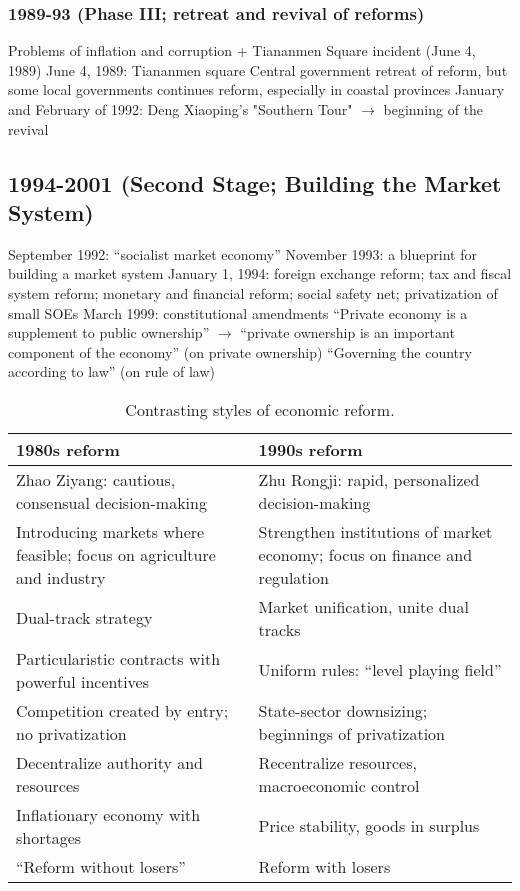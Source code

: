 \documentclass[11pt]{article}
\theoremstyle{definition}
\theoremstyle{remark}
\begin{document}
\subsubsection{1989-93 (Phase III; retreat and revival of reforms)}
\begin{outline}[enumerate]
\1 Problems of inflation and corruption + Tiananmen Square incident (June 4, 1989)
\1 June 4, 1989: Tiananmen square
\1 Central government retreat of reform, but some local governments continues reform, especially in coastal provinces
\1 January and February of 1992: Deng Xiaoping's "Southern Tour" $\to$ beginning of the revival
\end{outline}

\subsection{1994-2001 (Second Stage; Building the Market System)}
\begin{outline}[enumerate]
\1 September 1992: ``socialist market economy''
\1 November 1993: a blueprint for building a market system
\1 January 1, 1994: foreign exchange reform; tax and fiscal system reform; monetary and financial reform; social safety net; privatization of small SOEs
\1 March 1999: constitutional amendments
	\2 ``Private economy is a supplement to public ownership'' $\to$ ``private ownership is an important component of the economy'' (on private ownership)
	\2 ``Governing the country according to law'' (on rule of law)
\end{outline}

\begin{table}[ht]
\centering
\caption{Contrasting styles of economic reform.}
\begin{adjustbox}{width={\textwidth}}
\begin{tabular}[t]{p{}p{}}
\toprule
1980s reform&1990s reform\\
\midrule
Zhao Ziyang: cautious, consensual decision-making&Zhu Rongji: rapid, personalized decision-making\\
Introducing markets where feasible; focus on agriculture and industry&Strengthen institutions of market economy; focus on finance and regulation\\
Dual-track strategy&Market unification, unite dual tracks\\
Particularistic contracts with powerful incentives&Uniform rules: ``level playing field''\\
Competition created by entry; no privatization&State-sector downsizing; beginnings of privatization\\
Decentralize authority and resources&Recentralize resources, macroeconomic control\\
Inflationary economy with shortages&Price stability, goods in surplus\\
``Reform without losers''&Reform with losers\\
\bottomrule
\end{tabular}
\end{adjustbox}
\end{table}%
\end{document}

